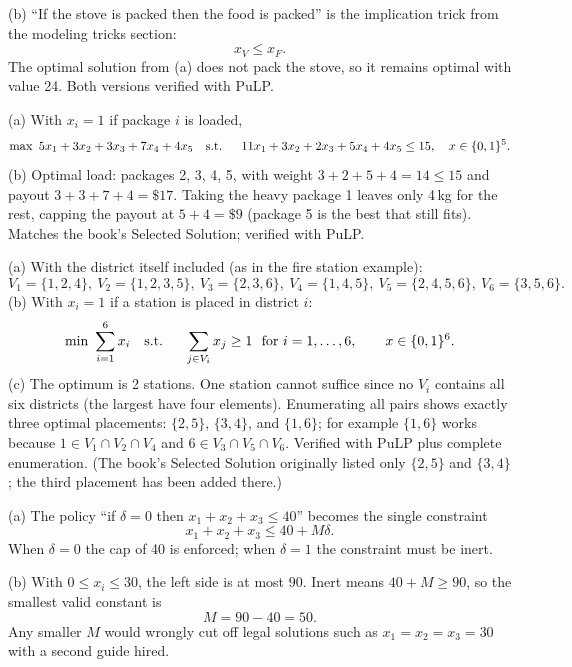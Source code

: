 (b) ``If the stove is packed then the food is packed'' is the implication trick from the modeling tricks section:
\[
x_V \leq x_F.
\]
The optimal solution from (a) does not pack the stove, so it remains optimal with value 24. Both versions verified with PuLP.


(a) With $x_i = 1$ if package $i$ is loaded,
\[
\max\ 5x_1 + 3x_2 + 3x_3 + 7x_4 + 4x_5
\quad \text{s.t.}\;\; \quad
11x_1 + 3x_2 + 2x_3 + 5x_4 + 4x_5 \leq 15,\quad x \in \{0,1\}^5.
\]
(b) Optimal load: packages 2, 3, 4, 5, with weight $3+2+5+4 = 14 \leq 15$ and payout $3+3+7+4 = \$17$. Taking the heavy package 1 leaves only 4\,kg for the rest, capping the payout at $5+4 = \$9$ (package 5 is the best that still fits). Matches the book's Selected Solution; verified with PuLP.


(a) With the district itself included (as in the fire station example):
\[
V_1 = \{1,2,4\},\ V_2 = \{1,2,3,5\},\ V_3 = \{2,3,6\},\ V_4 = \{1,4,5\},\ V_5 = \{2,4,5,6\},\ V_6 = \{3,5,6\}.
\]
(b) With $x_i = 1$ if a station is placed in district $i$:
\[
\min\ \sum_{i=1}^{6} x_i
\quad \text{s.t.}\;\; \quad
\sum_{j \in V_i} x_j \geq 1 \ \text{ for } i = 1,\dots,6, \qquad x \in \{0,1\}^6.
\]
(c) The optimum is 2 stations. One station cannot suffice since no $V_i$ contains all six districts (the largest have four elements). Enumerating all pairs shows exactly three optimal placements: $\{2,5\}$, $\{3,4\}$, and $\{1,6\}$; for example $\{1,6\}$ works because $1 \in V_1 \cap V_2 \cap V_4$ and $6 \in V_3 \cap V_5 \cap V_6$. Verified with PuLP plus complete enumeration. (The book's Selected Solution originally listed only $\{2,5\}$ and $\{3,4\}$; the third placement has been added there.)


(a) The policy ``if $\delta = 0$ then $x_1 + x_2 + x_3 \leq 40$'' becomes the single constraint
\[
x_1 + x_2 + x_3 \leq 40 + M\delta.
\]
When $\delta = 0$ the cap of 40 is enforced; when $\delta = 1$ the constraint must be inert.

(b) With $0 \leq x_i \leq 30$, the left side is at most $90$. Inert means $40 + M \geq 90$, so the smallest valid constant is
\[
M = 90 - 40 = 50.
\]
Any smaller $M$ would wrongly cut off legal solutions such as $x_1 = x_2 = x_3 = 30$ with a second guide hired.


